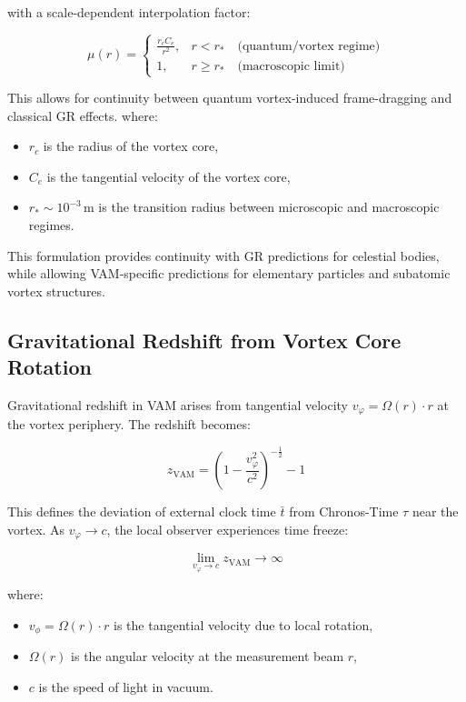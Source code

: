 \noindent with a scale-dependent interpolation factor:

\begin{equation}
    \mu(r) =
    \begin{cases}
        \frac{r_c C_e}{r^2}, & r < r_\ast \quad \text{(quantum/vortex regime)} \\
        1, & r \geq r_\ast \quad \text{(macroscopic limit)}
    \end{cases}
\end{equation}

This allows for continuity between quantum vortex-induced frame-dragging and classical GR effects.
where:
\begin{itemize}
    \item \( r_c \) is the radius of the vortex core,
    \item \( C_e \) is the tangential velocity of the vortex core,
    \item \( r_\ast \sim 10^{-3} \, \text{m} \) is the transition radius between microscopic and macroscopic regimes.
\end{itemize}

This formulation provides continuity with GR predictions for celestial bodies, while allowing VAM-specific predictions for elementary particles and subatomic vortex structures.

\subsection*{Gravitational Redshift from Vortex Core Rotation}

Gravitational redshift in VAM arises from tangential velocity \( v_\varphi = \Omega(r) \cdot r \) at the vortex periphery. The redshift becomes:

\begin{equation}
    z_\text{VAM} = \left( 1 - \frac{v_\varphi^2}{c^2} \right)^{-\frac{1}{2}} - 1
\end{equation}

This defines the deviation of external clock time \( \bar{t} \) from Chronos-Time \( \tau \) near the vortex. As \( v_\varphi \to c \), the local observer experiences time freeze:

\[
    \lim_{v_\varphi \to c} z_\text{VAM} \to \infty
\]

where:
\begin{itemize}
    \item \( v_\phi = \Omega(r) \cdot r \) is the tangential velocity due to local rotation,
    \item \( \Omega(r) \) is the angular velocity at the measurement beam \( r \),
    \item \( c \) is the speed of light in vacuum.

\end{itemize}

